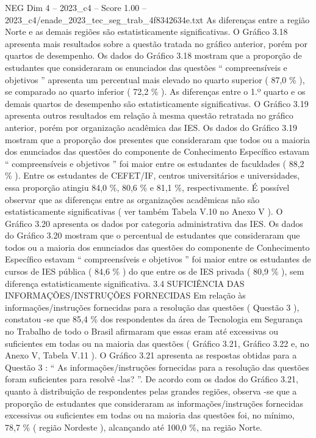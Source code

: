 \begin{textsample}{NEG Dim 4 – 2023\_c4 – Score 1.00 – 2023\_c4/enade\_2023\_tec\_seg\_trab\_4f8342634e.txt}
As diferenças entre a região Norte e as demais regiões são estatisticamente significativas.
O Gráfico 3.18 apresenta mais resultados sobre a questão tratada no gráfico anterior, porém por quartos de desempenho.
Os dados do Gráfico 3.18 mostram que a proporção de estudantes que consideraram os enunciados das questões “ compreensíveis e objetivos ” apresenta um percentual mais elevado no quarto superior ( 87,0 \% ), se comparado ao quarto inferior ( 72,2 \% ).
As diferenças entre o 1.º quarto e os demais quartos de desempenho são estatisticamente significativas.
O Gráfico 3.19 apresenta outros resultados em relação à mesma questão retratada no gráfico anterior, porém por organização acadêmica das IES.
Os dados do Gráfico 3.19 mostram que a proporção dos presentes que consideraram que todos ou a maioria dos enunciados das questões do componente de Conhecimento Específico estavam “ compreensíveis e objetivos ” foi maior entre os estudantes de faculdades ( 88,2 \% ).
Entre os estudantes de CEFET/IF, centros universitários e universidades, essa proporção atingiu 84,0 \%, 80,6 \% e 81,1 \%, respectivamente.
É possível observar que as diferenças entre as organizações acadêmicas não são estatisticamente significativas ( ver também Tabela V.10 no Anexo V ).
O Gráfico 3.20 apresenta os dados por categoria administrativa das IES.
Os dados do Gráfico 3.20 mostram que o percentual de estudantes que consideraram que todos ou a maioria dos enunciados das questões do componente de Conhecimento Específico estavam “ compreensíveis e objetivos ” foi maior entre os estudantes de cursos de IES pública ( 84,6 \% ) do que entre os de IES privada ( 80,9 \% ), sem diferença estatisticamente significativa. 3.4 SUFICIÊNCIA DAS INFORMAÇÕES/INSTRUÇÕES FORNECIDAS Em relação às informações/instruções fornecidas para a resolução das questões ( Questão 3 ), constatou -se que 85,4 \% dos respondentes da área de Tecnologia em Segurança no Trabalho de todo o Brasil afirmaram que essas eram até excessivas ou suficientes em todas ou na maioria das questões ( Gráfico 3.21, Gráfico 3.22 e, no Anexo V, Tabela V.11 ).
O Gráfico 3.21 apresenta as respostas obtidas para a Questão 3 : “ As informações/instruções fornecidas para a resolução das questões foram suficientes para resolvê -las? ”.
De acordo com os dados do Gráfico 3.21, quanto à distribuição de respondentes pelas grandes regiões, observa -se que a proporção de estudantes que consideraram as informações/instruções fornecidas excessivas ou suficientes em todas ou na maioria das questões foi, no mínimo, 78,7 \% ( região Nordeste ), alcançando até 100,0 \%, na região Norte.

\end{textsample}
